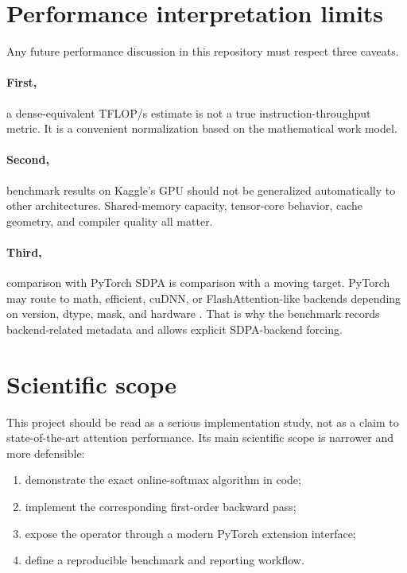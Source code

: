 \section{Performance interpretation limits}

Any future performance discussion in this repository must respect three caveats.

\paragraph{First,} a dense-equivalent TFLOP/s estimate is not a true instruction-throughput metric. It is a convenient normalization based on the mathematical work model.

\paragraph{Second,} benchmark results on Kaggle's GPU should not be generalized automatically to other architectures. Shared-memory capacity, tensor-core behavior, cache geometry, and compiler quality all matter.

\paragraph{Third,} comparison with PyTorch SDPA is comparison with a moving target. PyTorch may route to math, efficient, cuDNN, or FlashAttention-like backends depending on version, dtype, mask, and hardware \citep{pytorch212sdpa}. That is why the benchmark records backend-related metadata and allows explicit SDPA-backend forcing.

\section{Scientific scope}

This project should be read as a serious implementation study, not as a claim to state-of-the-art attention performance. Its main scientific scope is narrower and more defensible:
\begin{enumerate}
  \item demonstrate the exact online-softmax algorithm in code;
  \item implement the corresponding first-order backward pass;
  \item expose the operator through a modern PyTorch extension interface;
  \item define a reproducible benchmark and reporting workflow.
\end{enumerate}

